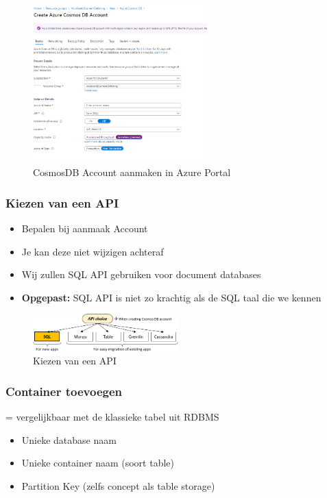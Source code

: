 \documentclass{article}
\newcommand{\bold}[1]{\textbf{#1}}
\begin{document}
\begin{figure}[H]
    \centering
    \includegraphics[width=0.6\textwidth]{cosmosdb-api-account.png}
    \caption{CosmosDB Account aanmaken in Azure Portal}
\end{figure}

\subsubsection{Kiezen van een API}

\begin{itemize}
    \item Bepalen bij aanmaak Account
    \item Je kan deze niet wijzigen achteraf
    \item Wij zullen SQL API gebruiken voor document databases
    \item \bold{Opgepast:} SQL API is niet zo krachtig als de SQL taal die we kennen
\end{itemize}

\begin{figure}[H]
    \centering
    \includegraphics[width=0.5\textwidth]{cosmosdb-api-choice.png}
    \caption{Kiezen van een API}
\end{figure}


\subsubsection{Container toevoegen}

= vergelijkbaar met de klassieke tabel uit RDBMS

\begin{itemize}
    \item Unieke database naam
    \item Unieke container naam (soort table)
    \item Partition Key (zelfs concept als table storage)
\end{itemize}
\end{document}
